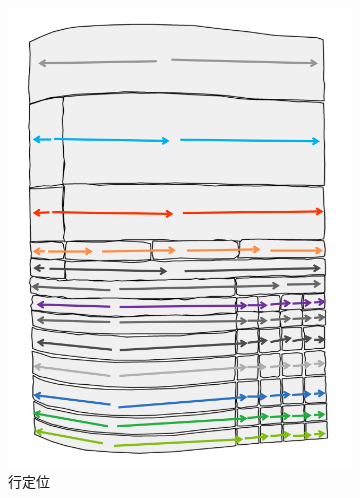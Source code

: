 \documentclass[UTF8,12pt, AutoFakeBold,fontset = founder]{ctexart}
\begin{document}
\begin{figure}[H]
    \centering
    \begin{subfigure}[b]{0.45\textwidth}
        \includegraphics[width=\textwidth]{../images/row.png}
        \caption{行定位}
        \label{fig:local-row}
    \end{subfigure}
    \hfill
    \begin{subfigure}[b]{0.45\textwidth}

\end{subfigure}
\end{figure}
\end{document}

